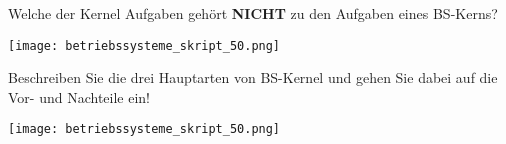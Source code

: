 \documentclass{article}
\begin{document}
\begin{tcolorbox}[colback=white!10!white,colframe=lightgray!75!black,
  savelowerto=\jobname_ex.tex,breakable,enhanced,lines before break=40]

\justifying
Welche der Kernel Aufgaben gehört \textbf{NICHT} zu den Aufgaben eines BS-Kerns?

\tcblower

\justifying
\begin{center}
\texttt{[image: betriebssysteme\_skript\_50.png]}
\end{center}

\end{tcolorbox}
\begin{tcolorbox}[colback=white!10!white,colframe=lightgray!75!black,
  savelowerto=\jobname_ex.tex,breakable,enhanced,lines before break=40]

\justifying
Beschreiben Sie die drei Hauptarten von BS-Kernel und gehen Sie dabei auf die Vor- und Nachteile ein!

\tcblower

\justifying
\begin{center}
\texttt{[image: betriebssysteme\_skript\_50.png]}
\end{center}

\end{tcolorbox}
\end{document}
